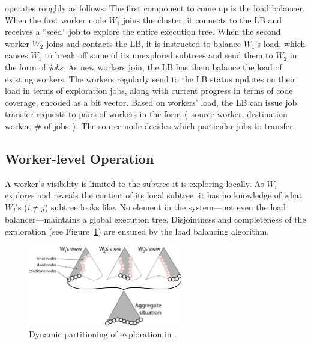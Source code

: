 \cnine operates roughly as follows: The first component to come up is the load balancer.  When the first worker node $W_1$ joins the \cnine cluster, it connects to the LB and receives a ``seed'' job to explore the entire execution tree.  When the second worker $W_2$ joins and contacts the LB, it is instructed to balance $W_1$'s load, which causes $W_1$ to break off some of its unexplored subtrees and send them to $W_2$ in the form of {\em jobs}.  As new workers join, the LB has them balance the load of existing workers.  The workers regularly send to the LB status updates on their load in terms of exploration jobs, along with current progress in terms of code coverage, encoded as a bit vector.  Based on workers' load, the LB can issue job transfer requests to pairs of workers in the form $\langle$~source worker, destination worker, \# of jobs~$\rangle$.  The source node decides which particular jobs to transfer.

\subsection{Worker-level Operation}
\label{sec:workerView}

A worker's visibility is limited to the subtree it is exploring locally.  As $W_i$ explores and reveals the content of its local subtree, it has no knowledge of what $W_j$'s ($i\ne j$) subtree looks like.  No element in the system---not even the load balancer---maintains a global execution tree.  Disjointness and completeness 
of the exploration (see Figure~\ref{fig:architecture}) are ensured by the load balancing algorithm.

\begin{figure}
  \centering
  \includegraphics[width=0.6\textwidth]{paas/figures/architecture-parsymbex}
  \caption{Dynamic partitioning of exploration in \cnine.}
 \label{fig:architecture}
\end{figure}

\newcommand{\dead}{dead\xspace}
\newcommand{\fence}{fence\xspace}
\newcommand{\candidate}{candidate\xspace}
\newcommand{\virtual}{virtual\xspace}
\newcommand{\materialized}{materialized\xspace}

